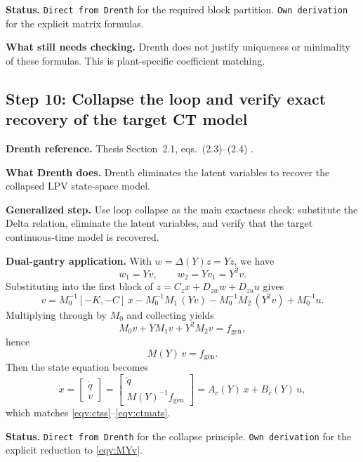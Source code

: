 \documentclass[11pt]{article}
\newcommand{\audititem}[2]{\par\smallskip\noindent\textbf{#1.} #2\par}
\newcommand{\statusline}[1]{\texttt{#1}}
\begin{document}
\audititem{Status}{\statusline{Direct from Drenth} for the required block
partition. \statusline{Own derivation} for the explicit matrix formulas.}

\audititem{What still needs checking}{Drenth does not justify uniqueness or
minimality of these formulas. This is plant-specific coefficient matching.}

\subsection{Step 10: Collapse the loop and verify exact recovery of the target CT model}

\audititem{Drenth reference}{Thesis Section~2.1, eqs.~(2.3)--(2.4)
\cite{drenth2025thesis}.}

\audititem{What Drenth does}{Drenth eliminates the latent variables to recover
the collapsed LPV state-space model.}

\audititem{Generalized step}{Use loop collapse as the main exactness check:
substitute the Delta relation, eliminate the latent variables, and verify that
the target continuous-time model is recovered.}

\audititem{Dual-gantry application}{With $w = \Delta(Y) z = Y z$, we have
\[
w_1 = Yv, \qquad w_2 = Yv_1 = Y^2 v.
\]
Substituting into the first block of
$z = C_z x + D_{zw} w + D_{zu} u$ gives
\[
v = M_0^{-1}[-K,-C]\,x - M_0^{-1}M_1\,(Yv) - M_0^{-1}M_2\,(Y^2 v) + M_0^{-1}u.
\]
Multiplying through by $M_0$ and collecting yields
\begin{equation}
    M_0 v + Y M_1 v + Y^2 M_2 v = f_{\mathrm{gen}},
    \label{eqv:loopcollapse}
\end{equation}
hence
\begin{equation}
    M(Y)\,v = f_{\mathrm{gen}}.
    \label{eqv:MYv}
\end{equation}
Then the state equation becomes
\[
\dot{x} = \begin{bmatrix} \dot{q} \\ v \end{bmatrix}
= \begin{bmatrix} \dot{q} \\ M(Y)^{-1} f_{\mathrm{gen}} \end{bmatrix}
= A_c(Y)\,x + B_c(Y)\,u,
\]
which matches \eqref{eqv:ctss}--\eqref{eqv:ctmats}.}

\audititem{Status}{\statusline{Direct from Drenth} for the collapse principle.
\statusline{Own derivation} for the explicit reduction to \eqref{eqv:MYv}.}
\end{document}
